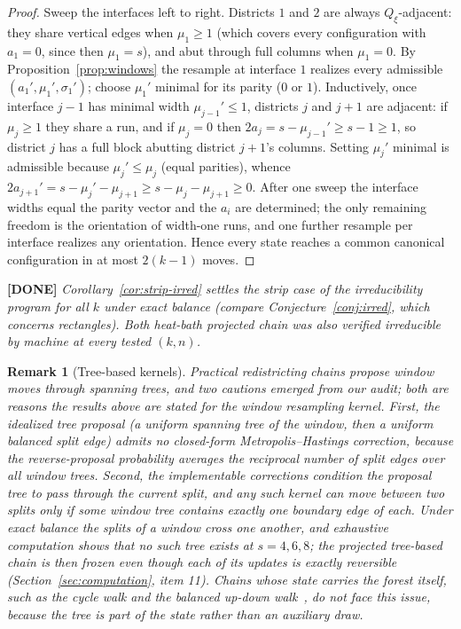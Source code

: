 \documentclass[11pt]{article}
\newcommand{\done}[1]{\medskip\noindent\textcolor{donecol}{\textbf{[DONE]} \emph{#1}}\medskip}
\newtheorem{remark}[theorem]{Remark}
\begin{document}
\begin{proof}
Sweep the interfaces left to right. Districts $1$ and $2$ are always
$Q_\xi$-adjacent: they share vertical edges when $\mu_1 \ge 1$ (which
covers every configuration with $a_1 = 0$, since then $\mu_1 = s$), and
abut through full columns when $\mu_1 = 0$. By
Proposition~\ref{prop:windows} the resample at interface $1$ realizes
every admissible $(a_1', \mu_1', \sigma_1')$; choose $\mu_1'$ minimal
for its parity ($0$ or $1$). Inductively, once interface $j-1$ has
minimal width $\mu_{j-1}' \le 1$, districts $j$ and $j+1$ are adjacent:
if $\mu_j \ge 1$ they share a run, and if $\mu_j = 0$ then
$2a_j = s - \mu_{j-1}' \ge s - 1 \ge 1$, so district $j$ has a full
block abutting district $j+1$'s columns. Setting $\mu_j'$ minimal is
admissible because $\mu_j' \le \mu_j$ (equal parities), whence
$2a_{j+1}' = s - \mu_j' - \mu_{j+1} \ge s - \mu_j - \mu_{j+1} \ge 0$.
After one sweep the interface widths equal the parity vector and the
$a_i$ are determined; the only remaining freedom is the orientation of
width-one runs, and one further resample per interface realizes any
orientation. Hence every state reaches a common canonical configuration
in at most $2(k-1)$ moves.
\end{proof}

\done{Corollary~\ref{cor:strip-irred} settles the strip case of the
irreducibility program for \emph{all} $k$ under \emph{exact} balance
(compare Conjecture~\ref{conj:irred}, which concerns rectangles). Both
heat-bath projected chain was also verified irreducible by machine at
every tested $(k, n)$.}

\begin{remark}[Tree-based kernels]
\label{rem:tree-kernels}
Practical redistricting chains propose window moves through spanning
trees, and two cautions emerged from our audit; both are reasons the
results above are stated for the window resampling kernel. First, the
idealized tree proposal (a uniform spanning tree of the window, then a
uniform balanced split edge) admits no closed-form Metropolis--Hastings
correction, because the reverse-proposal probability averages the
reciprocal number of split edges over all window trees. Second, the
implementable corrections condition the proposal tree to pass through
the current split, and any such kernel can move between two splits only
if some window tree contains exactly one boundary edge of each. Under
exact balance the splits of a window cross one another, and exhaustive
computation shows that no such tree exists at $s = 4, 6, 8$; the
projected tree-based chain is then frozen even though each of its
updates is exactly reversible (Section~\ref{sec:computation}, item 11).
Chains whose state carries the forest itself, such as the cycle walk and
the balanced up-down walk~\cite{deford2025cycle, akitaya2026bud}, do not
face this issue, because the tree is part of the state rather than an
auxiliary draw.
\end{remark}
\end{document}
